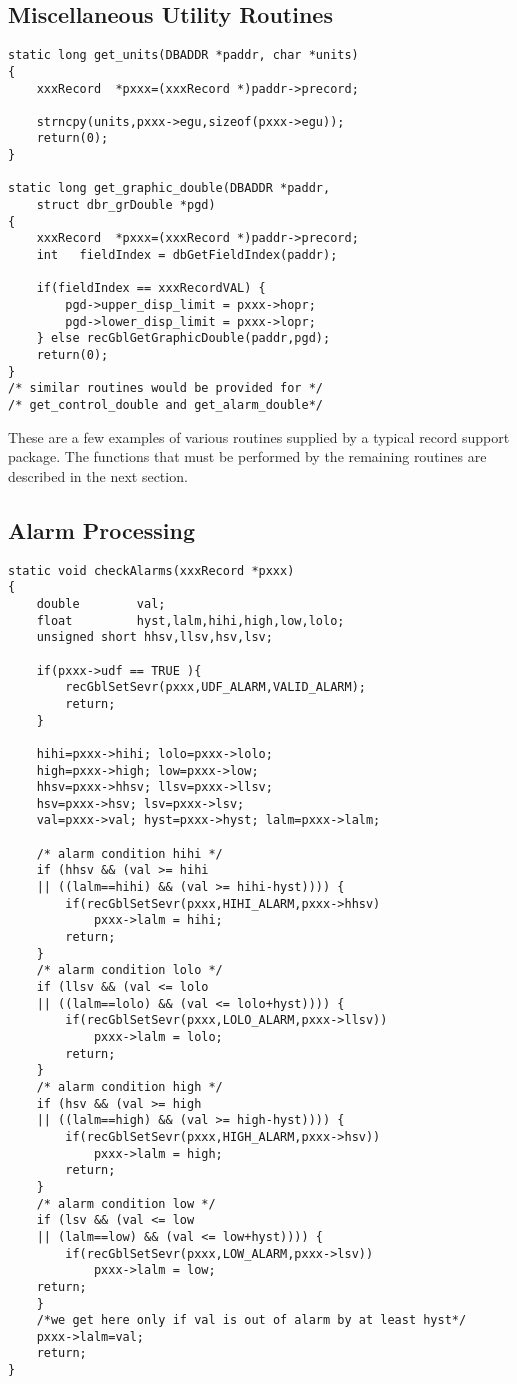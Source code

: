 \subsection{Miscellaneous Utility Routines}

\begin{verbatim}
static long get_units(DBADDR *paddr, char *units)
{
    xxxRecord  *pxxx=(xxxRecord *)paddr->precord;

    strncpy(units,pxxx->egu,sizeof(pxxx->egu));
    return(0);
}

static long get_graphic_double(DBADDR *paddr,
    struct dbr_grDouble *pgd)
{
    xxxRecord  *pxxx=(xxxRecord *)paddr->precord;
    int   fieldIndex = dbGetFieldIndex(paddr);

    if(fieldIndex == xxxRecordVAL) {
        pgd->upper_disp_limit = pxxx->hopr;
        pgd->lower_disp_limit = pxxx->lopr;
    } else recGblGetGraphicDouble(paddr,pgd);
    return(0);
}
/* similar routines would be provided for */
/* get_control_double and get_alarm_double*/
\end{verbatim}

These are a few examples of various routines supplied by a typical record support package. The functions that must be 
performed by the remaining routines are described in the next section.

\subsection{Alarm Processing}

\begin{verbatim}
static void checkAlarms(xxxRecord *pxxx)
{
    double        val;
    float         hyst,lalm,hihi,high,low,lolo;
    unsigned short hhsv,llsv,hsv,lsv;

    if(pxxx->udf == TRUE ){
        recGblSetSevr(pxxx,UDF_ALARM,VALID_ALARM);
        return;
    }

    hihi=pxxx->hihi; lolo=pxxx->lolo;
    high=pxxx->high; low=pxxx->low;
    hhsv=pxxx->hhsv; llsv=pxxx->llsv;
    hsv=pxxx->hsv; lsv=pxxx->lsv;
    val=pxxx->val; hyst=pxxx->hyst; lalm=pxxx->lalm;

    /* alarm condition hihi */
    if (hhsv && (val >= hihi 
    || ((lalm==hihi) && (val >= hihi-hyst)))) {
        if(recGblSetSevr(pxxx,HIHI_ALARM,pxxx->hhsv)
            pxxx->lalm = hihi;
        return;
    }
    /* alarm condition lolo */
    if (llsv && (val <= lolo 
    || ((lalm==lolo) && (val <= lolo+hyst)))) {
        if(recGblSetSevr(pxxx,LOLO_ALARM,pxxx->llsv))
            pxxx->lalm = lolo;
        return;
    }
    /* alarm condition high */
    if (hsv && (val >= high 
    || ((lalm==high) && (val >= high-hyst)))) {
        if(recGblSetSevr(pxxx,HIGH_ALARM,pxxx->hsv))
            pxxx->lalm = high;
        return;
    }
    /* alarm condition low */
    if (lsv && (val <= low 
    || (lalm==low) && (val <= low+hyst)))) {
        if(recGblSetSevr(pxxx,LOW_ALARM,pxxx->lsv))
            pxxx->lalm = low;
    return;
    }
    /*we get here only if val is out of alarm by at least hyst*/
    pxxx->lalm=val;
    return;
}
\end{verbatim}

